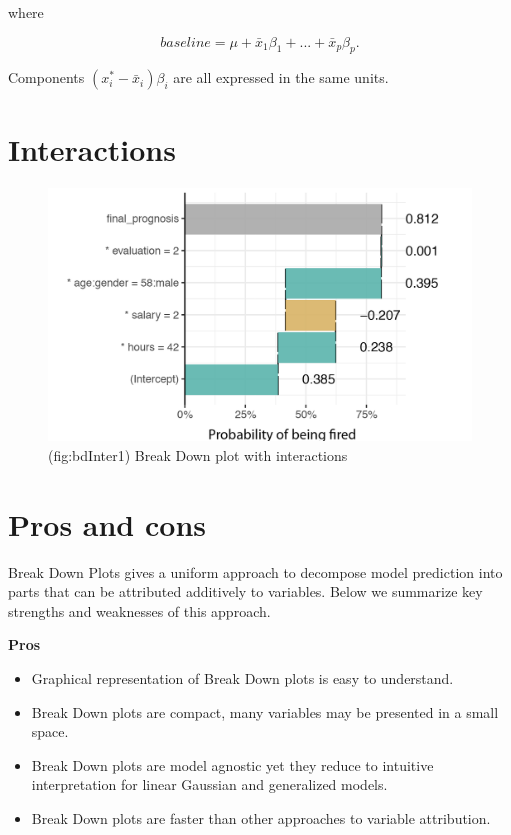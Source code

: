 \documentclass[]{book}
\providecommand{\tightlist}{%
  \setlength{\itemsep}{0pt}\setlength{\parskip}{0pt}}
\theoremstyle{definition}
\theoremstyle{definition}
\theoremstyle{definition}
\theoremstyle{remark}
\begin{document}
where

\[
baseline = \mu + \bar x_1 \beta_1 + ... + \bar x_p \beta_p.
\]

Components \((x^{*}_i - \bar x_i) \beta_i\) are all expressed in the
same units.

\hypertarget{interactions}{%
\section{Interactions}\label{interactions}}

\begin{figure}

{\centering \includegraphics[width=0.7\linewidth]{figure/bd_inter_1} 

}

\caption{(fig:bdInter1) Break Down plot with interactions }\label{fig:bdInter1}
\end{figure}

\hypertarget{pros-and-cons}{%
\section{Pros and cons}\label{pros-and-cons}}

Break Down Plots gives a uniform approach to decompose model prediction
into parts that can be attributed additively to variables. Below we
summarize key strengths and weaknesses of this approach.

\textbf{Pros}

\begin{itemize}
\tightlist
\item
  Graphical representation of Break Down plots is easy to understand.
\item
  Break Down plots are compact, many variables may be presented in a
  small space.
\item
  Break Down plots are model agnostic yet they reduce to intuitive
  interpretation for linear Gaussian and generalized models.
\item
  Break Down plots are faster than other approaches to variable
  attribution.
\end{itemize}
\end{document}
